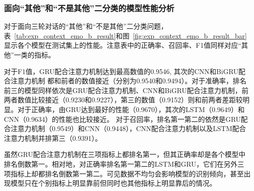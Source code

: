 \subsubsection{面向“其他”和“不是其他”二分类的模型性能分析}
\label{sssec:exp_context_emo_b_base}

对于面向三轮对话的“其他”和“不是其他”二分类问题，表~\ref{tab:exp_context_emo_b_result}和图~\ref{fig:exp_context_emo_b_result_bar}显示各个模型在测试集上的性能。注意表中的正确率、召回率、F1值同样对应“其他”一类的指标。

对于F1值，GRU配合注意力机制达到最高数值的0.9546, 其次的CNN和BiGRU配合注意力机制
都和前者的数值接近（分别为0.9540和0.9494）。对于准确率，排名前三的模型同样依次是GRU配合注意力机制、CNN和BiGRU配合注意力机制，前两者数值比较接近（0.9230和0.9227），第三的数值（0.9152）则和前两者差距较明显。对于正确率，由GRU达到最好的性能（0.9670），其次的LSTM（0.9649）和CNN（0.9634）的性能也比较接近。 对于召回率，排名第一第二的依然是GRU配合注意力机制（0.9549）和CNN（0.9448），CNN配合注意力机制以及LSTM配合注意力机制并排第三（0.9391）。

虽然GRU配合注意力机制在三项指标上都排名第一，但其正确率却是各个模型中排名倒数第一。相对地，对正确率排名第一第二的LSTM和GRU，它们在另外三项指标上却都排名倒数第一第二。可见数据不均匀会影响模型的识别倾向，甚至出现模型只在个别指标上明显靠前但同时也其他指标上明显靠后的情况。

